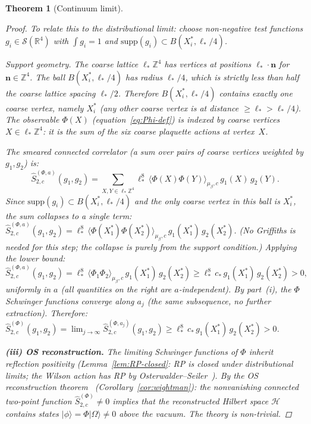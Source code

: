\documentclass[11pt]{article}
\newtheorem{theorem}{Theorem}[section]
\theoremstyle{definition}
\newcommand{\R}{\mathbb{R}}
\newcommand{\Z}{\mathbb{Z}}
\begin{document}
\begin{theorem}[Continuum limit]
\begin{proof}
To relate this to the distributional limit: choose
non-negative test functions
$g_i\in\mathcal{S}(\R^4)$ with $\int g_i=1$ and
$\mathrm{supp}(g_i)\subset B(X_i^*,\ell_*/4)$.

\emph{Support geometry.}
The coarse lattice $\ell_*\Z^4$ has vertices at positions
$\ell_*\cdot\mathbf{n}$ for $\mathbf{n}\in\Z^4$.
The ball $B(X_i^*,\ell_*/4)$ has radius $\ell_*/4$,
which is strictly less than half the coarse lattice
spacing $\ell_*/2$.  Therefore $B(X_i^*,\ell_*/4)$
contains exactly one coarse vertex, namely $X_i^*$
(any other coarse vertex is at distance $\ge\ell_*
>\ell_*/4$).  The observable $\Phi(X)$
(equation~\eqref{eq:Phi-def}) is indexed by coarse
vertices $X\in\ell_*\Z^4$: it is the sum of the six
coarse plaquette actions at vertex~$X$.

The smeared connected correlator (a sum over pairs
of coarse vertices weighted by $g_1,g_2$) is:
\begin{equation}\label{eq:smeared-Phi}
\hat S_{2,c}^{(\Phi,a)}(g_1,g_2)
=\sum_{X,Y\in\ell_*\Z^4}
\ell_*^8\,\langle\Phi(X)\Phi(Y)\rangle_{\mu_\beta,c}\,
g_1(X)\,g_2(Y).
\end{equation}
Since $\mathrm{supp}(g_i)\subset B(X_i^*,\ell_*/4)$
and the only coarse vertex in this ball is $X_i^*$,
the sum collapses to a single term:
$\hat S_{2,c}^{(\Phi,a)}(g_1,g_2)
=\ell_*^8\,\langle\Phi(X_1^*)\Phi(X_2^*)
\rangle_{\mu_\beta,c}\,g_1(X_1^*)\,g_2(X_2^*)$.
(No Griffiths is needed for this step; the collapse
is purely from the support condition.)
Applying the lower bound:
\begin{equation}\label{eq:smeared-Phi-lower}
\hat S_{2,c}^{(\Phi,a)}(g_1,g_2)
=\ell_*^8\,\langle\Phi_1\Phi_2
\rangle_{\mu_\beta,c}\,g_1(X_1^*)\,g_2(X_2^*)
\ge\ell_*^8\,c_*\,g_1(X_1^*)\,g_2(X_2^*)>0,
\end{equation}
uniformly in $a$ (all quantities on the right are
$a$-independent).
By part~(i), the $\Phi$ Schwinger functions converge
along $a_j$ (the same subsequence, no further extraction).
Therefore:
$\hat S_{2,c}^{(\Phi)}(g_1,g_2)
=\lim_{j\to\infty}\hat S_{2,c}^{(\Phi,a_j)}(g_1,g_2)
\ge\ell_*^8\,c_*\,g_1(X_1^*)\,g_2(X_2^*)>0$.

\textbf{(iii) OS reconstruction.}
The limiting Schwinger functions of $\Phi$ inherit
reflection positivity
(Lemma~\ref{lem:RP-closed}: RP is closed under
distributional limits; the Wilson action has RP by
Osterwalder--Seiler~\cite{OS78}).
By the OS reconstruction theorem~\cite{OS73}
(Corollary~\ref{cor:wightman}):
the nonvanishing connected two-point function
$\hat S_{2,c}^{(\Phi)}\ne 0$ implies that the
reconstructed Hilbert space $\mathcal{H}$ contains
states $|\phi\rangle=\Phi|{\Omega}\rangle\ne 0$
above the vacuum.  The theory is non-trivial.
\end{proof}


\end{theorem}
\end{document}
